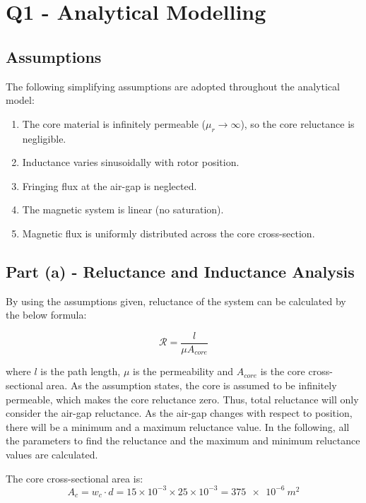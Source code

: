 \documentclass[12pt, a4paper]{article}
\begin{document}
\section{Q1 - Analytical Modelling}

\subsection{Assumptions}

The following simplifying assumptions are adopted throughout the analytical model:

\begin{enumerate}[leftmargin=*, label=\arabic*.]
    \item The core material is infinitely permeable ($\mu_r \to \infty$), so the core reluctance is negligible.
    \item Inductance varies sinusoidally with rotor position.
    \item Fringing flux at the air-gap is neglected.
    \item The magnetic system is linear (no saturation).
    \item Magnetic flux is uniformly distributed across the core cross-section.
\end{enumerate}







\subsection{Part (a) - Reluctance and Inductance Analysis}
By using the assumptions given, reluctance of the system can be calculated by the below formula:

\begin{equation}
    \mathcal{R} = \frac{l}{\mu  A_{core}}
    \label{eq:reluctance}
\end{equation}

where $l$ is the path length, $\mu$ is the permeability and $A_{core}$ is the core cross-sectional area. As the assumption states, the core is assumed to be infinitely permeable, which makes the core reluctance zero. Thus, total reluctance will only consider the air-gap reluctance. As the air-gap changes with respect to position, there will be a minimum and a maximum reluctance value. In the following, all the parameters to find the reluctance and the maximum and minimum reluctance values are calculated.

The core cross-sectional area is:
\begin{equation}
    A_c = w_c \cdot d = 15 \times 10^{-3} \times 25 \times 10^{-3} = \SI{375e-6}{m^2}
\end{equation}
\end{document}

